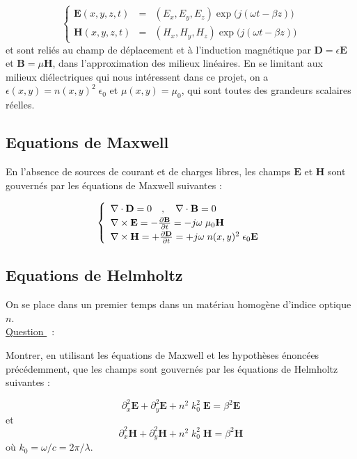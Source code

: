 \documentclass[a4paper, 12pt]{article}
\newcounter{nquestion}
\newenvironment{question}[1]{
	\refstepcounter{nquestion}
	\vspace{2mm}\\
	\noindent \underline{Question \thenquestion}~:\vspace{-3mm}
	\begin{leftbar} \noindent #1}
	{\end{leftbar} \vspace{2mm}\\}
\begin{document}
\begin{equation}
\left\{
  \begin{array}{lcr}
  \textbf{E}(x, y, z, t) &=& (E_x, E_y, E_z) \exp \big(j(\omega t - \beta z) \big) \\
  
\textbf{H}(x, y, z, t) &=& (H_x, H_y, H_z) \exp \big(j(\omega t - \beta z) \big)
  \end{array}
\right.
\label{fields}
\end{equation}
et sont reliés au champ de déplacement et à l'induction magnétique par $\textbf{D} = \epsilon \textbf{E}$ et $\textbf{B} = \mu \textbf{H}$, dans l'approximation des milieux linéaires. En se limitant aux milieux diélectriques qui nous intéressent dans ce projet, on a $\epsilon(x, y) = n(x, y)^2\;  \epsilon_0$ et $\mu(x, y)=\mu_0$, qui sont toutes des grandeurs scalaires réelles.

\subsection{Equations de Maxwell}

En l'absence de sources de courant et de charges libres, les champs $\textbf{E}$ et $\textbf{H}$ sont gouvernés par les équations de Maxwell suivantes :

\begin{equation}
\left\{
\renewcommand*{\arraystretch}{1.2}
  \begin{array}{lcr}
  \nabla  \cdot \textbf{D}=0 \quad, \quad \nabla  \cdot \textbf{B}=0 \\
  \nabla \times \textbf{E} = -\frac{\partial \textbf{B}}{\partial t} =-j \omega \; \mu_0 \textbf{H} \\
\nabla \times \textbf{H} = +\frac{\partial \textbf{D}}{\partial t} = +j \omega \; n(x, y)^2\;  \epsilon_0 \textbf{E} 
  \end{array}
\right.
\label{maxwell}
\end{equation}

\subsection{Equations de Helmholtz}

On se place dans un premier temps dans un matériau homogène d'indice optique $n$.
\begin{question}
Montrer, en utilisant les équations de Maxwell et les hypothèses énoncées
précédemment, que les champs sont gouvernés par les équations de Helmholtz suivantes :

\begin{equation}
  \partial_x^2 \textbf{E} + \partial_y^2 \textbf{E} + n^2\; k_0^2\;  \textbf{E}  = \beta^2 \textbf{E} 
\label{helmE}
\end{equation}
et
\begin{equation}
  \partial_x^2 \textbf{H} + \partial_y^2 \textbf{H} + n^2\; k_0^2\; \textbf{H}  = \beta^2 \textbf{H}
\label{helmH}
\end{equation}
où $k_0=\omega/c=2 \pi/\lambda$.
\end{question} 
\end{document}

